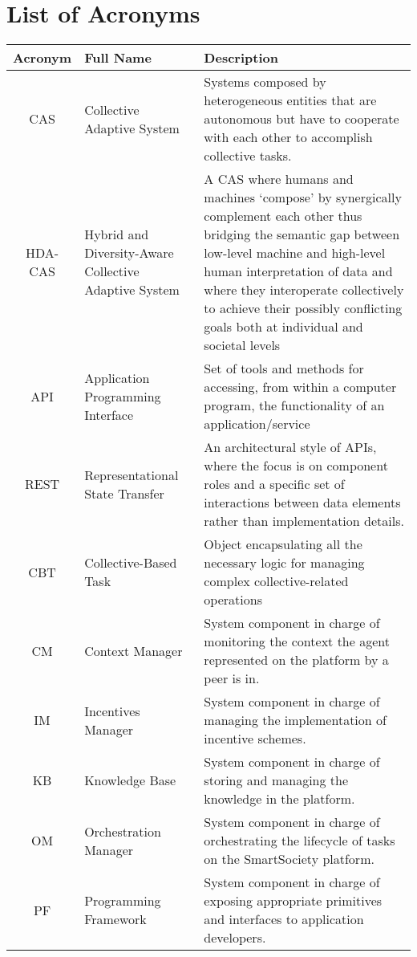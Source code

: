 \documentclass{SmartReport}
\begin{document}
\section*{List of Acronyms}
\begin{tabular}{|c|p{3cm}|p{10cm}|}
\hline 
\textbf{Acronym} & \textbf{Full Name} & \textbf{Description} \\
\hline 
\hline 
CAS & Collective Adaptive System & Systems composed by heterogeneous entities that are autonomous but have to cooperate with each other to accomplish collective tasks.\\ \hline
HDA-CAS & Hybrid and Diversity-Aware Collective Adaptive System & A CAS where humans and machines `compose' by synergically complement each other thus bridging the semantic gap between low-level machine and high-level human interpretation of data and where they interoperate collectively to achieve their possibly conflicting goals both at individual and societal levels\\ \hline
API & Application Programming Interface & Set of tools and methods for accessing, from within a computer program, the functionality of an application/service \\ \hline
REST & Representational State Transfer & An architectural style of APIs, where the focus is on component roles and a specific set of interactions between data elements rather than implementation details.\\ \hline
CBT & Collective-Based Task & Object encapsulating all the necessary logic for managing complex collective-related operations \\ \hline 
CM & Context Manager & System component in charge of monitoring the
context the agent represented on the platform by a peer is in.\\
\hline
IM & Incentives Manager & System component in charge of managing the implementation of incentive schemes.\\  
\hline 
KB & Knowledge Base &  System component in charge of storing and managing the knowledge in the platform.\\
\hline
OM & Orchestration Manager &  System component in charge of
orchestrating the lifecycle of tasks on the SmartSociety platform. \\
\hline 
PF & Programming Framework &  System component in charge of exposing
appropriate primitives and interfaces to application developers.\\

\end{tabular}
\end{document}
